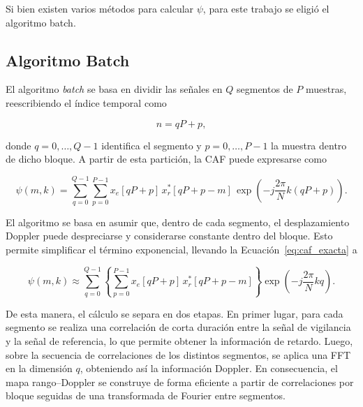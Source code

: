 Si bien existen varios métodos para calcular $\psi$, para este trabajo se eligió el algoritmo batch.

\subsection{Algoritmo Batch}

El algoritmo \textit{batch} se basa en dividir las señales en \(Q\) segmentos de \(P\) muestras, reescribiendo el índice temporal como

\begin{equation}
n=qP+p,
\end{equation}

donde \(q=0,\ldots,Q-1\) identifica el segmento y \(p=0,\ldots,P-1\) la muestra dentro de dicho bloque. A partir de esta partición, la CAF puede expresarse como

\begin{equation}
\label{eq:caf_exacta}
\psi(m,k)=\sum_{q=0}^{Q-1}\sum_{p=0}^{P-1}
x_e \left[ qP+p \right] \, x_r^{*}\left[qP+p-m\right]\,
\exp\!\left(-j\frac{2\pi}{N}k(qP+p)\right).
\end{equation}

El algoritmo se basa en asumir que, dentro de cada segmento, el desplazamiento Doppler puede despreciarse y considerarse constante dentro del bloque. Esto permite simplificar el término exponencial, llevando la Ecuación~\ref{eq:caf_exacta} a

\begin{equation}
\psi(m,k)\approx
\sum_{q=0}^{Q-1}
\left\{
\sum_{p=0}^{P-1}
x_e \left[ qP+p \right] \, x_r^{*}\left[qP+p-m\right]
\right\}
\exp\!\left(-j\frac{2\pi}{N}kq\right).
\end{equation}

De esta manera, el cálculo se separa en dos etapas. En primer lugar, para cada segmento se realiza una correlación de corta duración entre la señal de vigilancia y la señal de referencia, lo que permite obtener la información de retardo. Luego, sobre la secuencia de correlaciones de los distintos segmentos, se aplica una FFT en la dimensión \(q\), obteniendo así la información Doppler. En consecuencia, el mapa rango--Doppler se construye de forma eficiente a partir de correlaciones por bloque seguidas de una transformada de Fourier entre segmentos.


